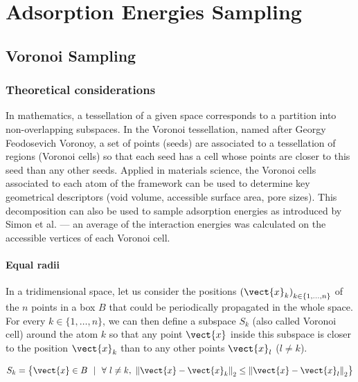 \documentclass[main]{subfiles}
\begin{document}
\chapter{Adsorption Energies Sampling}
\vspace*{-1\baselineskip}

\section{Voronoi Sampling}

\subsection{Theoretical considerations}

In mathematics, a tessellation of a given space corresponds to a partition into non-overlapping subspaces. In the Voronoi tessellation, named after Georgy Feodosevich Voronoy, a set of points (seeds) are associated to a tessellation of regions (Voronoi cells) so that each seed has a cell whose points are closer to this seed than any other seeds.\autocite{Rycroft_2009} Applied in materials science, the Voronoi cells associated to each atom of the framework can be used to determine key geometrical descriptors (void volume, accessible surface area, pore sizes). This decomposition can also be used to sample adsorption energies as introduced by Simon et al. --- an average of the interaction energies was calculated on the accessible vertices of each Voronoi cell.\autocite{Simon_2015}

\subsubsection{Equal radii}

In a tridimensional space, let us consider the positions ${(\vect{x}_k)}_{k\in\{1,\ldots,n\}}$ of the $n$ points in a box $B$ that could be periodically propagated in the whole space. For every $k\in\{1,\ldots,n\}$, we can then define a subspace $S_{k}$ (also called Voronoi cell) around the atom $k$ so that any point $\vect{x}$ inside this subspace is closer to the position $\vect{x}_k$ than to any other points $\vect{x}_l$ ($l\neq k$). 

\begin{equation}\label{eq:voronoi_partition}
  S_{k} = \left\{\vect{x} \in B\ \ |\ \ \forall\ l\neq k,\ {\lVert \vect{x}-\vect{x}_k \rVert}_2 \leq {\lVert \vect{x}-\vect{x}_l \rVert}_2 \right\}
\end{equation}
\end{document}
